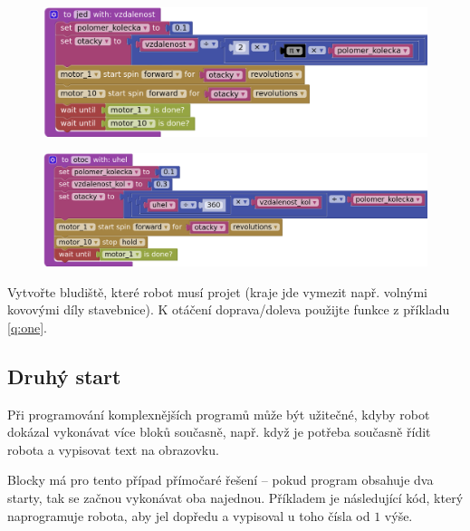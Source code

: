 \documentclass[../main.tex]{subfiles}
\begin{document}
	\begin{solution}
		\begin{figure}
			\centering
			\begin{minipage}{0.7\textwidth}
				\includegraphics[width=\linewidth]{Images/05/fjed.png}
			\end{minipage}
		\end{figure}

		\begin{figure}
			\centering
			\begin{minipage}{0.7\textwidth}
				\includegraphics[width=\linewidth]{Images/05/fotoc.png}
			\end{minipage}
		\end{figure}
	\end{solution}

	\begin{question*}
		Vytvořte bludiště, které robot musí projet (kraje jde vymezit např. volnými kovovými díly stavebnice). K otáčení doprava/doleva použijte funkce z příkladu \ref{q:one}.
	\end{question*}

	\subsection{Druhý start}
	Při programování komplexnějších programů může být užitečné, kdyby robot dokázal vykonávat více bloků současně, např. když je potřeba současně řídit robota a vypisovat text na obrazovku.

	Blocky má pro tento případ přímočaré řešení -- pokud program obsahuje dva starty, tak se začnou vykonávat oba najednou. Příkladem je následující kód, který naprogramuje robota, aby jel dopředu a vypisoval u toho čísla od $1$ výše.
\end{document}
